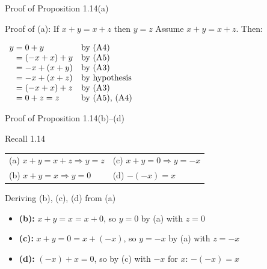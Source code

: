 \documentclass[aspectratio=169,12pt,t]{beamer}
\begin{document}
{%
\begin{frame}{Proof of Proposition 1.14(a)}
  \begin{proofblock}{Proof of (a): If $x + y = x + z$ then $y = z$}
    Assume $x + y = x + z$. Then:
    \begin{center}
    $\begin{array}{r@{\;}l@{\quad}l}
        y &= 0 + y              & \text{by (A4)} \\
          &= (-x + x) + y       & \text{by (A5)} \\
          &= -x + (x + y)       & \text{by (A3)} \\
          &= -x + (x + z)       & \text{by hypothesis} \\
          &= (-x + x) + z       & \text{by (A3)} \\
          &= 0 + z = z          & \text{by (A5), (A4)}
    \end{array}$
    \end{center}
  \end{proofblock}

\end{frame}

\begin{frame}{Proof of Proposition 1.14(b)--(d)}
  \small
  \begin{thmblock}{Recall 1.14}
    \begin{tabular}{@{}l@{\qquad}l@{}}
      (a) $x + y = x + z \Rightarrow y = z$ & (c) $x + y = 0 \Rightarrow y = -x$ \\[2pt]
      (b) $x + y = x \Rightarrow y = 0$     & (d) $-(-x) = x$
    \end{tabular}
  \end{thmblock}

  \vspace{0.3em}
  \begin{proofblock}{Deriving (b), (c), (d) from (a)}
    \begin{itemize}
      \item \textbf{(b):} $x + y = x = x + 0$, so $y = 0$ by (a) with $z = 0$
      \item \textbf{(c):} $x + y = 0 = x + (-x)$, so $y = -x$ by (a) with $z = -x$
      \item \textbf{(d):} $(-x) + x = 0$, so by (c) with $-x$ for $x$: $-(-x) = x$
    \end{itemize}
  \end{proofblock}


\end{frame}}
\end{document}
